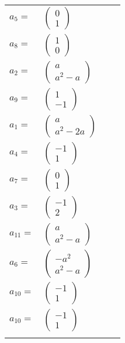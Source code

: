 \documentclass[1p]{elsarticle_modified}
\theoremstyle{definition}
\begin{document}
\begin{tabular}{m{7pt} m{180pt} m{7pt} m{180pt} }
\flushright $a_{5}=$&$\begin{pmatrix}0\\1\end{pmatrix}$ \\
\flushright $a_{8}=$&$\begin{pmatrix}1\\0\end{pmatrix}$ \\
\flushright $a_{2}=$&$\begin{pmatrix}a\\a^2- a\end{pmatrix}$ \\
\flushright $a_{9}=$&$\begin{pmatrix}1\\-1\end{pmatrix}$ \\
\flushright $a_{1}=$&$\begin{pmatrix}a\\a^2-2 a\end{pmatrix}$ \\
\flushright $a_{4}=$&$\begin{pmatrix}-1\\1\end{pmatrix}$ \\
\flushright $a_{7}=$&$\begin{pmatrix}0\\1\end{pmatrix}$ \\
\flushright $a_{3}=$&$\begin{pmatrix}-1\\2\end{pmatrix}$ \\
\flushright $a_{11}=$&$\begin{pmatrix}a\\a^2- a\end{pmatrix}$ \\
\flushright $a_{6}=$&$\begin{pmatrix}- a^2\\a^2- a\end{pmatrix}$ \\
\flushright $a_{10}=$&$\begin{pmatrix}-1\\1\end{pmatrix}$\\ \flushright $a_{10}=$&$\begin{pmatrix}-1\\1\end{pmatrix}$\\&\end{tabular}
\end{document}
